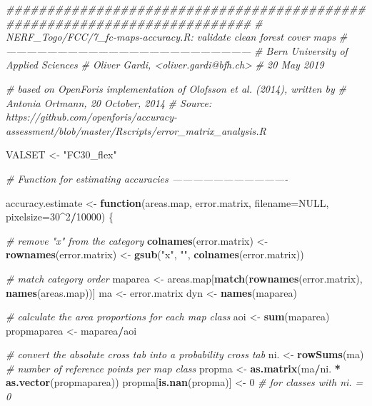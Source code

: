\documentclass[a4paper, notitlepage, 12pt, krantz2]{krantz}
\newenvironment{Shaded}{\begin{snugshade}}{\end{snugshade}}
\newcommand{\CommentTok}[1]{\textcolor[rgb]{0.56,0.35,0.01}{\textit{#1}}}
\newcommand{\ControlFlowTok}[1]{\textcolor[rgb]{0.13,0.29,0.53}{\textbf{#1}}}
\newcommand{\DataTypeTok}[1]{\textcolor[rgb]{0.13,0.29,0.53}{#1}}
\newcommand{\DecValTok}[1]{\textcolor[rgb]{0.00,0.00,0.81}{#1}}
\newcommand{\KeywordTok}[1]{\textcolor[rgb]{0.13,0.29,0.53}{\textbf{#1}}}
\newcommand{\NormalTok}[1]{#1}
\newcommand{\OperatorTok}[1]{\textcolor[rgb]{0.81,0.36,0.00}{\textbf{#1}}}
\newcommand{\OtherTok}[1]{\textcolor[rgb]{0.56,0.35,0.01}{#1}}
\newcommand{\StringTok}[1]{\textcolor[rgb]{0.31,0.60,0.02}{#1}}
\begin{document}
\begin{Shaded}
\begin{Highlighting}[]
\CommentTok{##########################################################################}
\CommentTok{# NERF_Togo/FCC/7_fc-maps-accuracy.R: validate clean forest cover maps}
\CommentTok{# ------------------------------------------------------------------------}
\CommentTok{# Bern University of Applied Sciences}
\CommentTok{# Oliver Gardi, <oliver.gardi@bfh.ch>}
\CommentTok{# 20 May 2019}

\CommentTok{# based on OpenForis implementation of Olofsson et al. (2014), written by}
\CommentTok{# Antonia Ortmann, 20 October, 2014}
\CommentTok{# Source: https://github.com/openforis/accuracy-assessment/blob/master/Rscripts/error_matrix_analysis.R}

\NormalTok{VALSET <-}\StringTok{ "FC30_flex"}

\CommentTok{# Function for estimating accuracies ----------------------------------}
  
\NormalTok{accuracy.estimate <-}\StringTok{ }\ControlFlowTok{function}\NormalTok{(areas.map, error.matrix, }\DataTypeTok{filename=}\OtherTok{NULL}\NormalTok{, }\DataTypeTok{pixelsize=}\DecValTok{30}\OperatorTok{^}\DecValTok{2}\OperatorTok{/}\DecValTok{10000}\NormalTok{) \{}
  
  \CommentTok{# remove "x" from the category }
  \KeywordTok{colnames}\NormalTok{(error.matrix) <-}\StringTok{ }\KeywordTok{rownames}\NormalTok{(error.matrix) <-}\StringTok{ }\KeywordTok{gsub}\NormalTok{(}\StringTok{"x"}\NormalTok{, }\StringTok{""}\NormalTok{, }\KeywordTok{colnames}\NormalTok{(error.matrix))}
  
  \CommentTok{# match category order}
\NormalTok{  maparea         <-}\StringTok{ }\NormalTok{areas.map[}\KeywordTok{match}\NormalTok{(}\KeywordTok{rownames}\NormalTok{(error.matrix), }\KeywordTok{names}\NormalTok{(areas.map))]}
\NormalTok{  ma              <-}\StringTok{ }\NormalTok{error.matrix}
\NormalTok{  dyn             <-}\StringTok{ }\KeywordTok{names}\NormalTok{(maparea)}
  
  \CommentTok{# calculate the area proportions for each map class}
\NormalTok{  aoi <-}\StringTok{ }\KeywordTok{sum}\NormalTok{(maparea)}
\NormalTok{  propmaparea <-}\StringTok{ }\NormalTok{maparea}\OperatorTok{/}\NormalTok{aoi}
  
  \CommentTok{# convert the absolute cross tab into a probability cross tab}
\NormalTok{  ni. <-}\StringTok{ }\KeywordTok{rowSums}\NormalTok{(ma)                  }\CommentTok{# number of reference points per map class}
\NormalTok{  propma <-}\StringTok{  }\KeywordTok{as.matrix}\NormalTok{(ma}\OperatorTok{/}\NormalTok{ni. }\OperatorTok{*}\StringTok{ }\KeywordTok{as.vector}\NormalTok{(propmaparea))}
\NormalTok{  propma[}\KeywordTok{is.nan}\NormalTok{(propma)] <-}\StringTok{ }\DecValTok{0}          \CommentTok{# for classes with ni. = 0}
  

\end{Highlighting}
\end{Shaded}
\end{document}
